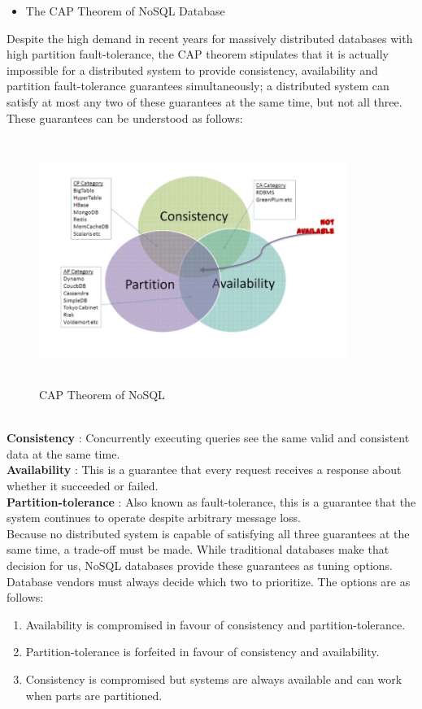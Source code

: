 \begin{itemize}
    \item The CAP Theorem of NoSQL Database
\end{itemize}
\hspace*{0.7in} Despite the high demand in recent years for massively distributed databases with high partition fault-tolerance, the CAP theorem stipulates that it is actually impossible for a distributed system to provide consistency, availability and partition fault-tolerance guarantees simultaneously; a distributed system can satisfy at most any two of these guarantees at the same time, but not all three. These guarantees can be understood as follows:
\\
\begin{figure}[h]
\centering
  \includegraphics[width=10cm,height=8cm]{C1.png}
  \caption{CAP Theorem of NoSQL}\label{CAP Theorem of NoSQL}
\end{figure}
\\
\textbf{Consistency }: Concurrently executing queries see the same valid and consistent data at the same time. \\
\textbf{Availability }: This is a guarantee that every request receives a response about whether it succeeded or failed. \\
\textbf{Partition-tolerance }: Also known as fault-tolerance, this is a guarantee that the system continues to operate despite arbitrary message loss.\\

\hspace*{0.7in} Because no distributed system is capable of satisfying all three guarantees at the same time, a trade-off must be made. While traditional databases make that decision for us, NoSQL databases provide these guarantees as tuning options. Database vendors must always decide which two to prioritize. The options are as follows:
\begin{enumerate}
  \item Availability is compromised in favour of consistency and partition-tolerance.
  \item Partition-tolerance is forfeited in favour of consistency and availability.
  \item Consistency is compromised but systems are always available and can work when parts are partitioned.
\end{enumerate}

